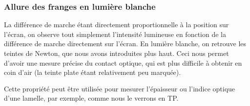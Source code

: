 \documentclass[11pt,fleqn]{book} %
\begin{document}
\subsubsection{Allure des franges en lumière blanche}

La différence de marche étant directement proportionnelle à la position sur l'écran, on observe tout simplement l'intensité lumineuse en fonction de la différence de marche directement sur l'écran. En lumière blanche, on retrouve les teintes de Newton, que nous avons introduites plus haut. Ceci nous permet d'avoir une mesure précise du contact optique, qui est plus difficile à obtenir en coin d'air (la teinte plate étant relativement peu marquée). 

\begin{remark}
	Cette propriété peut être utilisée pour mesurer l'épaisseur ou l'indice optique d'une lamelle, par exemple, comme nous le verrons en TP.
\end{remark}
\end{document}
